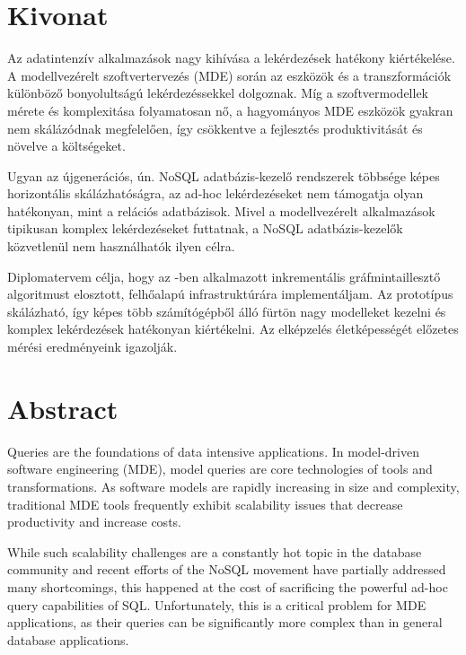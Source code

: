\chapter*{Kivonat}

Az adatintenzív alkalmazások nagy kihívása a lekérdezések hatékony kiértékelése. A modellvezérelt szoftvertervezés (MDE) során az eszközök és a transzformációk különböző bonyolultságú lekérdezéssekkel dolgoznak. Míg a szoftvermodellek mérete és komplexitása folyamatosan nő, a hagyományos MDE eszközök gyakran nem skálázódnak megfelelően, így csökkentve a fejlesztés produktivitását és növelve a költségeket.

Ugyan az újgenerációs, ún. NoSQL adatbázis-kezelő rendszerek többsége képes horizontális skálázhatóságra, az ad-hoc lekérdezéseket nem támogatja olyan hatékonyan, mint a relációs adatbázisok. Mivel a modellvezérelt alkalmazások tipikusan komplex lekérdezéseket futtatnak, a NoSQL adatbázis-kezelők közvetlenül nem használhatók ilyen célra.

Diplomatervem célja, hogy az \eiq{}-ben alkalmazott inkrementális gráfmintaillesztő algoritmust elosztott, felhőalapú infrastruktúrára implementáljam. Az \iqd{} prototípus skálázható, így képes több számítógépből álló fürtön nagy modelleket kezelni és komplex lekérdezések hatékonyan kiértékelni. Az elképzelés életképességét előzetes mérési eredményeink igazolják.

\vfill

\chapter*{Abstract}

Queries are the foundations of data intensive applications. In model-driven software engineering (MDE), model queries are core technologies of tools and transformations. As software models are rapidly increasing in size and complexity, traditional MDE tools frequently exhibit scalability issues that decrease productivity and increase costs.

While such scalability challenges are a constantly hot topic in the database community and recent efforts of the NoSQL movement have partially addressed many shortcomings, this happened at the cost of sacrificing the powerful ad-hoc query capabilities of SQL. Unfortunately, this is a critical problem for MDE applications, as their queries can be significantly more complex than in general database applications.

